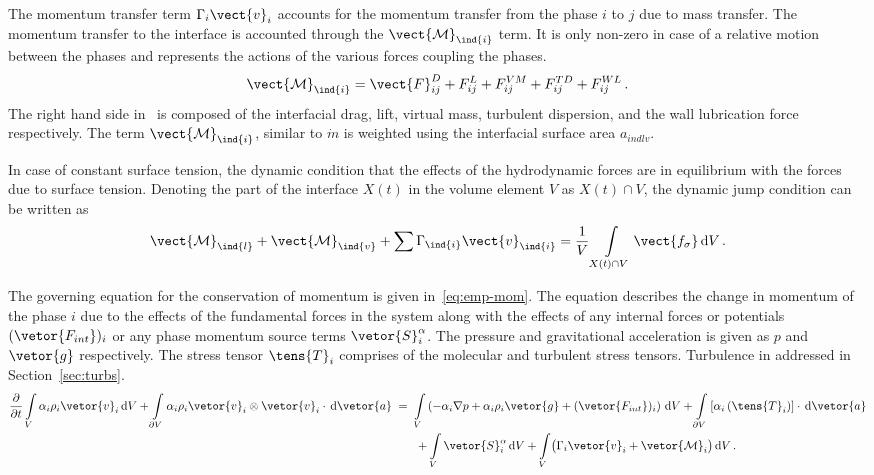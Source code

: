The momentum transfer term $\Gamma_{i}\vect{v}_{i}$ accounts for the momentum transfer from 
 the phase $i$ to $j$ due to mass transfer. The momentum transfer to the interface is accounted through 
 the \(\vect{\mathcal{M}}_{\ind{i}}\) term. It is only non-zero in case 
 of a relative motion between the phases and represents the actions of the various forces coupling the phases.
 \begin{equation}\label{eq:mom-trans}
  \vect{\mathcal{M}}_{\ind{i}} = \vect{F}_{ij}^{D} + F_{ij}^{L} + F_{ij}^{VM} + F_{ij}^{TD} + F_{ij}^{WL}\,.
 \end{equation}
The right hand side in~ is composed of the interfacial drag, lift, virtual mass, turbulent 
dispersion, and the wall lubrication force respectively. The term $\vect{\mathcal{M}}_{\ind{i}}$, similar to
$\dot{m}$ is weighted using the interfacial surface area $a_{ind{lv}}$.

In case of constant surface tension, the dynamic condition that the effects of the hydrodynamic forces are 
 in equilibrium with the forces due to surface tension. Denoting the part of the interface $X(t)$ in the 
 volume element $V$ as $X(t) \cap V$, the dynamic jump condition can be written as
 \begin{equation}
  \vect{\mathcal{M}}_{\ind{l}} + \vect{\mathcal{M}}_{\ind{v}} + \sum \Gamma_{\ind{i}} \vect{v}_{\ind{i}}
  =
  \frac{1}{V}\int\limits_{X(t) \cap V} 
    \vect{f_{\sigma}}\,\mathrm{d}V\,.
 \end{equation}


The governing equation for the conservation of momentum is given in~\eqref{eq:emp-mom}.
 The equation describes the change in momentum of the phase $i$ due to the effects of the
 fundamental forces in the system along with the effects of any internal forces or potentials $(\vetor{F_{int}})_{i}$
 or any phase momentum source terms $\vetor{S}_{i}^{\alpha}$. The pressure and gravitational acceleration is given as $p$ and $\vetor{g}$ respectively.
 The stress tensor $\tens{T}_{i}$ comprises of the molecular and turbulent stress tensors. Turbulence
 in addressed in Section~\ref{sec:turbs}.
\begin{equation}\label{eq:emp-mom}
\begin{split}
\frac{\partial}{\partial t}
\int\limits_{V} \alpha_{i} \rho_{i} \vetor{v}_{i} \,\mathrm{d}V
+ \int\limits_{\partial V} \alpha_{i} \rho_{i} \vetor{v}_{i} \otimes \vetor{v}_{i} \cdot\,\mathrm{d}\vetor{a}
&\;=\; 
\int\limits_{V} \left(-\alpha_{i} \nabla p 
+ \alpha_{i} \rho_{i} \vetor{g}
+ (\vetor{F_{int}})_{i} \right) \,\mathrm{d}V
+ \int\limits_{\partial V} \left[ \alpha_{i} \left( \tens{T}_{i}\right) \right] \cdot \,\mathrm{d}\vetor{a} \\
&\qquad {} + \int\limits_{V} \vetor{S}^{\alpha}_{i} \,\mathrm{d}V
+ \int\limits_{V}  \bigl(\Gamma_{i} \vetor{v}_{i} + \vetor{\mathcal{M}}_{i}\bigr)  \,\mathrm{d}V\,.
\end{split}
\end{equation}


